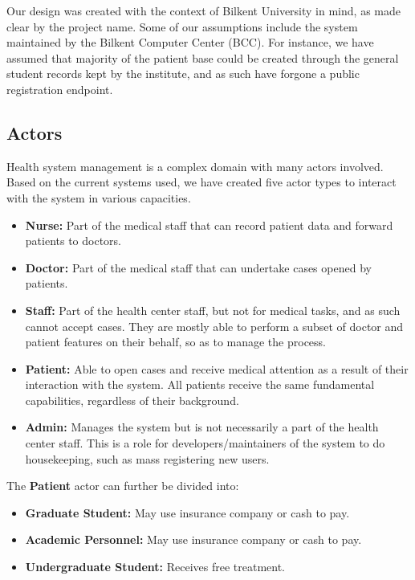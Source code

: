 \documentclass[a4paper, 12pt, titlepage]{article}
\begin{document}
  Our design was created with the context of Bilkent University in mind, as made clear by the project name.
  Some of our assumptions include the system maintained by the Bilkent Computer Center (BCC).
  For instance, we have assumed that majority of the patient base could be created through the general student records
  kept by the institute, and as such have forgone a public registration endpoint.

  \subsection{Actors}

  Health system management is a complex domain with many actors involved.
  Based on the current systems used, we have created five actor types to interact with the system in various capacities.

  \begin{itemize}
    \item \textbf{Nurse:} Part of the medical staff that can record patient data and forward patients to doctors.
    \item \textbf{Doctor:} Part of the medical staff that can undertake cases opened by patients.
    \item \textbf{Staff:} Part of the health center staff, but not for medical tasks, and as such cannot accept cases.
      They are mostly able to perform a subset of doctor and patient features on their behalf, so as to manage the process.
    \item \textbf{Patient:} Able to open cases and receive medical attention as a result of their interaction with the system.
      All patients receive the same fundamental capabilities, regardless of their background.
    \item \textbf{Admin:} Manages the system but is not necessarily a part of the health center staff.
      This is a role for developers/maintainers of the system to do housekeeping, such as mass registering new users.
  \end{itemize}

  The \textbf{Patient} actor can further be divided into:

  \begin{itemize}
    \item \textbf{Graduate Student:} May use insurance company or cash to pay.
    \item \textbf{Academic Personnel:} May use insurance company or cash to pay.
    \item \textbf{Undergraduate Student:} Receives free treatment.
  \end{itemize}
\end{document}
